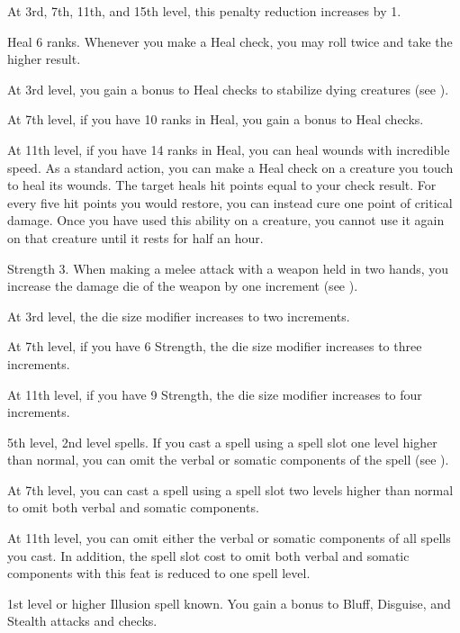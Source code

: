     At 3rd, 7th, 11th, and 15th level, this penalty reduction increases by 1.

    \featpre Heal 6 ranks.
    \featben Whenever you make a Heal check, you may roll twice and take the higher result.

    At 3rd level, you gain a  bonus to Heal checks to stabilize dying creatures (see ).

    At 7th level, if you have 10 ranks in Heal, you gain a  bonus to Heal checks.

    At 11th level, if you have 14 ranks in Heal, you can heal wounds with incredible speed.
    As a standard action, you can make a Heal check on a creature you touch to heal its wounds.
    The target heals hit points equal to your check result.
    For every five hit points you would restore, you can instead cure one point of critical damage.
    Once you have used this ability on a creature, you cannot use it again on that creature until it rests for half an hour.

    \featpre Strength 3.
    \featben When making a melee attack with a weapon held in two hands, you increase the damage die of the weapon by one increment (see ).

    At 3rd level, the die size modifier increases to two increments.

    At 7th level, if you have 6 Strength, the die size modifier increases to three increments.

    At 11th level, if you have 9 Strength, the die size modifier increases to four increments.

    \featpre 5th level, 2nd level spells.
    \featben If you cast a spell using a spell slot one level higher than normal, you can omit the verbal or somatic components of the spell (see ).

    At 7th level, you can cast a spell using a spell slot two levels higher than normal to omit both verbal and somatic components.

    At 11th level, you can omit either the verbal or somatic components of all spells you cast.
    In addition, the spell slot cost to omit both verbal and somatic components with this feat is reduced to one spell level.

    \featpre 1st level or higher Illusion spell known.
    \featben You gain a  bonus to Bluff, Disguise, and Stealth attacks and checks.

